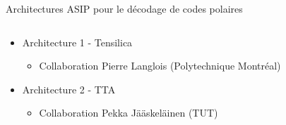 \documentclass[t,compress,mathserif,12pt,xcolor=dvipsnames]{beamer}
\begin{document}
\begin{frame}[t]{Architectures ASIP pour le décodage de codes polaires}
  \begin{minipage}[t][5.0cm][t]{\textwidth}
    \begin{columns}[T]
      \begin{column}{0.56\textwidth}
        \begin{itemize}
          \item<+-> Architecture 1 - Tensilica
          \begin{itemize}
            \item<1-> Collaboration Pierre Langlois (Polytechnique Montréal)
          \end{itemize}
          \item<+-> Architecture 2 - TTA
          \begin{itemize}
            \item<2-> Collaboration Pekka Jääskeläinen (TUT)
          \end{itemize}
        \end{itemize}
      \end{column}
      \begin{column}{0.04\textwidth}


\end{column}
\end{columns}
\end{minipage}
\end{frame}
\end{document}
